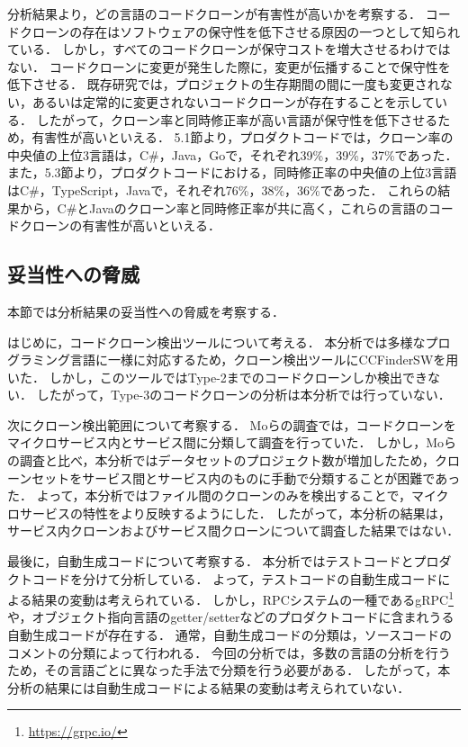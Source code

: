 \documentclass[T,J]{fose}
\begin{document}
分析結果より，どの言語のコードクローンが有害性が高いかを考察する．
コードクローンの存在はソフトウェアの保守性を低下させる原因の一つとして知られている．
しかし，すべてのコードクローンが保守コストを増大させるわけではない．
コードクローンに変更が発生した際に，変更が伝播することで保守性を低下させる．
既存研究では，プロジェクトの生存期間の間に一度も変更されない，あるいは定常的に変更されないコードクローンが存在することを示している\cite{balalaie2016migrating}\cite{svajlenko2014evaluating}．
したがって，クローン率と同時修正率が高い言語が保守性を低下させるため，有害性が高いといえる．
5.1節より，プロダクトコードでは，クローン率の中央値の上位3言語は，C\#，Java，Goで，それぞれ39\%，39\%，37\%であった．
また，5.3節より，プロダクトコードにおける，同時修正率の中央値の上位3言語はC\#，TypeScript，Javaで，それぞれ76\%，38\%，36\%であった．
これらの結果から，C\#とJavaのクローン率と同時修正率が共に高く，これらの言語のコードクローンの有害性が高いといえる．


\subsection{妥当性への脅威}
本節では分析結果の妥当性への脅威を考察する．

はじめに，コードクローン検出ツールについて考える．
本分析では多様なプログラミング言語に一様に対応するため，クローン検出ツールにCCFinderSWを用いた．
しかし，このツールではType-2までのコードクローンしか検出できない．
したがって，Type-3のコードクローンの分析は本分析では行っていない．

次にクローン検出範囲について考察する．
Moらの調査では，コードクローンをマイクロサービス内とサービス間に分類して調査を行っていた．
しかし，Moらの調査と比べ，本分析ではデータセットのプロジェクト数が増加したため，クローンセットをサービス間とサービス内のものに手動で分類することが困難であった\cite{mo2021existence}．
よって，本分析ではファイル間のクローンのみを検出することで，マイクロサービスの特性をより反映するようにした．
したがって，本分析の結果は，サービス内クローンおよびサービス間クローンについて調査した結果ではない．

最後に，自動生成コードについて考察する．
本分析ではテストコードとプロダクトコードを分けて分析している．
よって，テストコードの自動生成コードによる結果の変動は考えられている．
しかし，RPCシステムの一種であるgRPC\footnote{\url{https://grpc.io/}}や，オブジェクト指向言語のgetter/setterなどのプロダクトコードに含まれうる自動生成コードが存在する．
通常，自動生成コードの分類は，ソースコードのコメントの分類によって行われる．
今回の分析では，多数の言語の分析を行うため，その言語ごとに異なった手法で分類を行う必要がある．
したがって，本分析の結果には自動生成コードによる結果の変動は考えられていない．
\end{document}
